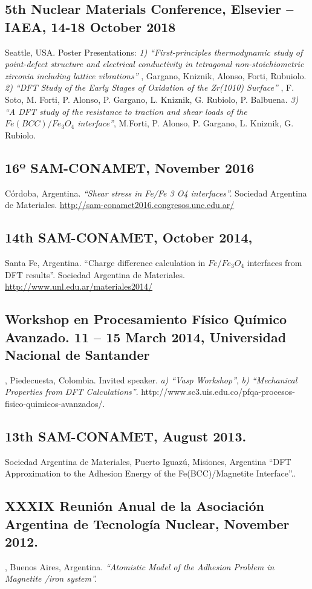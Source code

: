 \documentclass{my_cv}
\begin{document}
\subsection{ 5th Nuclear Materials Conference, Elsevier – IAEA, 14-18 October 2018} Seattle, USA. Poster Presentations:
\emph{ 1) “First-principles thermodynamic study of point-defect structure and electrical conductivity in tetragonal non-stoichiometric zirconia including lattice vibrations”} , Gargano, Kniznik, Alonso, Forti, Rubuiolo. \emph{ 2) “DFT Study of the Early Stages of Oxidation of the Zr(1010) Surface”} , F. Soto, M. Forti, P. Alonso, P. Gargano, L. Kniznik, G. Rubiolo, P. Balbuena. \emph{ 3) “A DFT study of the resistance to traction and shear loads of the $Fe(BCC) / Fe_3O_4$ interface”}, M.Forti, P. Alonso, P. Gargano, L. Kniznik, G. Rubiolo. 

\subsection{16º SAM-CONAMET, November 2016} Córdoba, Argentina. \emph{“Shear stress in Fe/Fe 3 O4 interfaces”. }Sociedad Argentina de Materiales. \url{http://sam-conamet2016.congresos.unc.edu.ar/}

\subsection{14th SAM-CONAMET, October 2014,} Santa Fe, Argentina. “Charge difference calculation in $Fe/Fe_3O_4$ interfaces from DFT results”. Sociedad Argentina de Materiales. \url{http://www.unl.edu.ar/materiales2014/}

\subsection{ Workshop en Procesamiento Físico Químico Avanzado. 11 – 15 March 2014, Universidad Nacional de Santander}, Piedecuesta, Colombia. Invited speaker. \emph{ a) “Vasp Workshop”},\emph{ b) “Mechanical Properties from DFT Calculations”}. 
 http://www.sc3.uis.edu.co/pfqa-procesos-fisico-quimicos-avanzados/.

\subsection{13th SAM-CONAMET, August 2013.} Sociedad Argentina de Materiales, Puerto Iguazú, Misiones, Argentina “DFT Approximation to the Adhesion Energy of the Fe(BCC)/Magnetite Interface”..

\subsection{XXXIX Reunión Anual de la Asociación Argentina de Tecnología Nuclear, November 2012.}, Buenos Aires, Argentina.
\emph{ “Atomistic Model of the Adhesion Problem in Magnetite /iron system”. }
\end{document}
